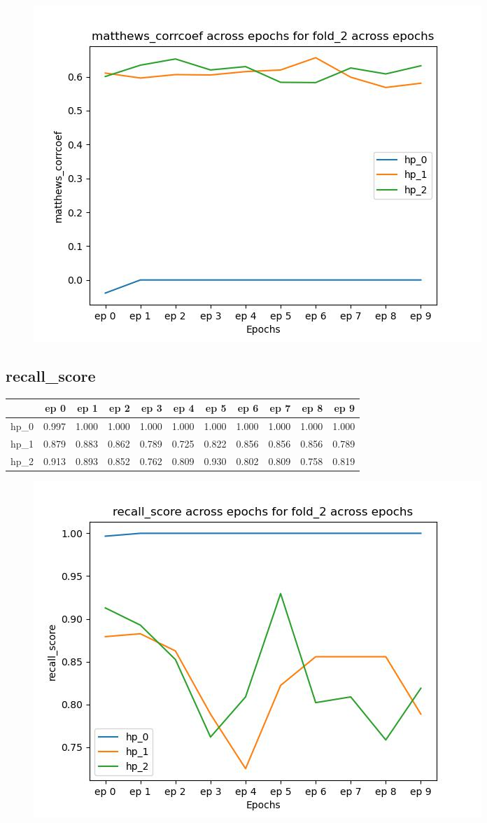 \documentclass{article}
\begin{document}
\begin{figure}[H]
\includegraphics[scale = 0.75]{fold_2/matthews_corrcoef}
\end{figure}
\subsection{recall\_score}
\begin{tabular}{lrrrrrrrrrr}
\toprule
{} &   ep 0 &   ep 1 &   ep 2 &   ep 3 &   ep 4 &   ep 5 &   ep 6 &   ep 7 &   ep 8 &   ep 9 \\
\midrule
hp\_0 &  0.997 &  1.000 &  1.000 &  1.000 &  1.000 &  1.000 &  1.000 &  1.000 &  1.000 &  1.000 \\
hp\_1 &  0.879 &  0.883 &  0.862 &  0.789 &  0.725 &  0.822 &  0.856 &  0.856 &  0.856 &  0.789 \\
hp\_2 &  0.913 &  0.893 &  0.852 &  0.762 &  0.809 &  0.930 &  0.802 &  0.809 &  0.758 &  0.819 \\
\bottomrule
\end{tabular}

\begin{figure}[H]
\includegraphics[scale = 0.75]{fold_2/recall_score}
\end{figure}
\end{document}
